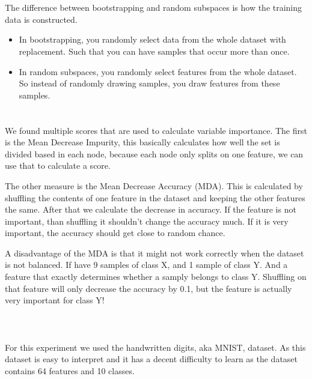 \documentclass[11pt]{article}
\begin{document}
\section{}
The difference between bootstrapping and random subspaces is how the training data is constructed. 
\begin{itemize}
	\item In bootstrapping, you randomly select data from the whole dataset with replacement. Such that you can have samples that occur more than once.
	\item In random subspaces, you randomly select features from the whole dataset. So instead of randomly drawing samples, you draw features from these samples.
\end{itemize}


\section{}
We found multiple scores that are used to calculate variable importance. The first is the Mean Decrease Impurity, this basically calculates how well the set is divided based in each node, because each node only splits on one feature, we can use that to calculate a score.

The other measure is the Mean Decrease Accuracy (MDA). This is calculated by shuffling the contents of one feature in the dataset and keeping the other features the same. After that we calculate the decrease in accuracy. If the feature is not important, than shuffling it shouldn't change the accuracy much. If it is very important, the accuracy should get close to random chance. 

A disadvantage of the MDA is that it might not work correctly when the dataset is not balanced. If have 9 samples of class X, and 1 sample of class Y. And a feature that exactly determines whether a samply belongs to class Y. Shuffling on that feature will only decrease the accuracy by 0.1, but the feature is actually very important for class Y!

\section{}

~\\
For this experiment we used the handwritten digits, aka MNIST, dataset. As this dataset is easy to interpret and it has a decent difficulty to learn as the dataset contains 64 features and 10 classes.
\end{document}
